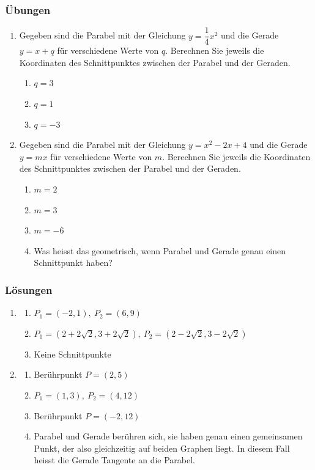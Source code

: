 \subsubsection{Übungen}
\begin{enumerate}
    \item Gegeben sind die Parabel mit der Gleichung $y=\dfrac{1}{4}x^2$ und die Gerade $y=x+q$ für verschiedene Werte von $q$. Berechnen Sie jeweils die Koordinaten des Schnittpunktes zwischen der Parabel und der Geraden.
          \begin{enumerate}
              \item $q=3$
              \item $q=1$
              \item $q=-3$
          \end{enumerate}
    \item Gegeben sind die Parabel mit der Gleichung $y=x^2-2x+4$ und die Gerade $y=mx$ für verschiedene Werte von $m$. Berechnen Sie jeweils die Koordinaten des Schnittpunktes zwischen der Parabel und der Geraden.
          \begin{enumerate}
              \item $m=2$
              \item $m=3$
              \item $m=-6$
              \item Was heisst das geometrisch, wenn Parabel und Gerade genau einen Schnittpunkt haben?
          \end{enumerate}
\end{enumerate}
\newpage
\subsubsection*{Lösungen}
\begin{enumerate}
    \item
          \begin{enumerate}
              \item $P_1=(-2,1),\ P_2=(6,9)$
              \item $P_1=(2+2\sqrt{2},3+2\sqrt{2}),\ P_2=(2-2\sqrt{2},3-2\sqrt{2})$
              \item Keine Schnittpunkte
          \end{enumerate}
    \item
          \begin{enumerate}
              \item Berührpunkt $P=(2,5)$
              \item $P_1=(1,3),\ P_2=(4,12)$
              \item Berührpunkt $P=(-2,12)$
              \item Parabel und Gerade berühren sich, sie haben genau einen gemeinsamen Punkt, der also gleichzeitig auf beiden Graphen liegt. In diesem Fall heisst die Gerade Tangente an die Parabel.
          \end{enumerate}
\end{enumerate}
\newpage
